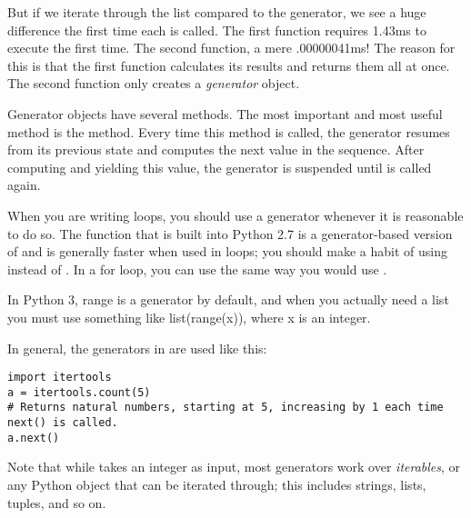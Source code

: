 But if we iterate through the list compared to the generator, we see a huge difference the first time each is called. The first function requires 1.43ms to execute the first time.  The second function,
a mere .00000041ms!  The reason for this is that the first function calculates its results and returns them all at once. The second function only creates a \emph{generator} object.  

Generator objects have several methods.
The most important and most useful method is the  method.  Every time this method is called, 
the generator resumes from its previous state and computes the next value in the sequence. After computing and yielding this value, the generator is suspended until  is called again.

When you are writing  loops, you should use a generator whenever it is reasonable to do so.
The  function that is built into Python 2.7 is a generator-based version of  and is generally faster when used in  loops; you should make a habit of using  instead of . In a for loop, you can use  the same way you would use .

\begin{info}
In Python 3, range is a generator by default, and when you actually need a list you must use something like list(range(x)), where x is an integer.
\end{info}

In general, the generators in  are used like this:
\begin{lstlisting}
import itertools
a = itertools.count(5) 
# Returns natural numbers, starting at 5, increasing by 1 each time next() is called.
a.next()
\end{lstlisting}

Note that while  takes an integer as input, most generators work over \emph{iterables}, or any Python object that can be iterated through; this includes strings, lists, tuples, and so on.

